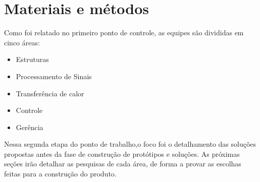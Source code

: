 \chapter{Materiais e métodos}

Como foi relatado no primeiro ponto de controle, as equipes são divididas em cinco áreas:
\begin{itemize}
\item Estruturas
\item Processamento de Sinais
\item Transferência de calor
\item Controle
\item Gerência
\end{itemize}

Nessa segunda etapa do ponto de trabalho,o foco foi o detalhamento das soluções propostas antes da fase de construção de protótipos e soluções. As próximas seções irão detalhar as pesquisas de cada área, de forma a provar as escolhas feitas para a construção do produto.

